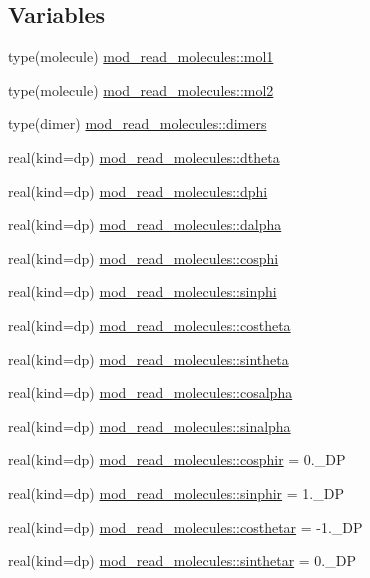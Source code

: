 \subsection*{Variables}
\begin{DoxyCompactItemize}
\item 
type(molecule) \hyperlink{namespacemod__read__molecules_a8511d6e8d8197d2f03d47376a43e50ce}{mod\+\_\+read\+\_\+molecules\+::mol1}
\item 
type(molecule) \hyperlink{namespacemod__read__molecules_a73b2cd7c32146644cc496892645c2e68}{mod\+\_\+read\+\_\+molecules\+::mol2}
\item 
type(dimer) \hyperlink{namespacemod__read__molecules_a9947a968e59ca99a71fee1f02e557172}{mod\+\_\+read\+\_\+molecules\+::dimers}
\item 
real(kind=dp) \hyperlink{namespacemod__read__molecules_ad9dc9f5af77e0db504939d241333d857}{mod\+\_\+read\+\_\+molecules\+::dtheta}
\item 
real(kind=dp) \hyperlink{namespacemod__read__molecules_a4a9088b19ec4e6043af7894bfa20e87b}{mod\+\_\+read\+\_\+molecules\+::dphi}
\item 
real(kind=dp) \hyperlink{namespacemod__read__molecules_a25040f2691a3f50a481882e7e6a9816d}{mod\+\_\+read\+\_\+molecules\+::dalpha}
\item 
real(kind=dp) \hyperlink{namespacemod__read__molecules_aa56e64086c25d032f85b2528c2dfc698}{mod\+\_\+read\+\_\+molecules\+::cosphi}
\item 
real(kind=dp) \hyperlink{namespacemod__read__molecules_aae35f31c005f89820a9d8806eb04c7c6}{mod\+\_\+read\+\_\+molecules\+::sinphi}
\item 
real(kind=dp) \hyperlink{namespacemod__read__molecules_aecec9abde85a75891e653ded1997b267}{mod\+\_\+read\+\_\+molecules\+::costheta}
\item 
real(kind=dp) \hyperlink{namespacemod__read__molecules_a4bb74ab5f27ab9f8418a9174422796c4}{mod\+\_\+read\+\_\+molecules\+::sintheta}
\item 
real(kind=dp) \hyperlink{namespacemod__read__molecules_ac0e3265d01367c7b422240b7ebc4be85}{mod\+\_\+read\+\_\+molecules\+::cosalpha}
\item 
real(kind=dp) \hyperlink{namespacemod__read__molecules_ac481718cc895478caac0b9b181436fc3}{mod\+\_\+read\+\_\+molecules\+::sinalpha}
\item 
real(kind=dp) \hyperlink{namespacemod__read__molecules_a169468a3161d2d2e074c0acacf22289a}{mod\+\_\+read\+\_\+molecules\+::cosphir} = 0.\+\_\+\+DP
\item 
real(kind=dp) \hyperlink{namespacemod__read__molecules_ab49181669d915cd61bc91b536f9013ed}{mod\+\_\+read\+\_\+molecules\+::sinphir} = 1.\+\_\+\+DP
\item 
real(kind=dp) \hyperlink{namespacemod__read__molecules_afe28a6b2c9ac300c072b7315c4cf36fb}{mod\+\_\+read\+\_\+molecules\+::costhetar} = -\/1.\+\_\+\+DP
\item 
real(kind=dp) \hyperlink{namespacemod__read__molecules_a8f483c69b7c8592ed311a0ba7b816e4a}{mod\+\_\+read\+\_\+molecules\+::sinthetar} = 0.\+\_\+\+DP
\end{DoxyCompactItemize}
